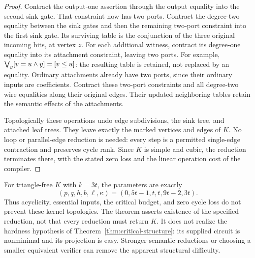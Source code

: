 \begin{proof}
Contract the output-one assertion through the output equality into
the second sink gate. That constraint now has two ports. Contract
the degree-two equality between the sink gates and then the remaining
two-port constraint into the first sink gate. Its surviving table
is the conjunction of the three original incoming bits, at vertex $z$.
For each additional witness, contract its degree-one equality into
its attachment constraint, leaving two ports. For example,
$\bigvee_y[v=u\land y]=[v\le u]$: the resulting table is retained,
not replaced by an equality. Ordinary attachments
already have two ports, since their ordinary inputs are coefficients.
Contract these two-port constraints and all degree-two wire equalities
along their original edges. Their updated neighboring tables retain
the semantic effects of the attachments.

Topologically these operations undo edge subdivisions, the sink tree,
and attached leaf trees. They leave exactly the marked vertices and
edges of $K$. No loop or parallel-edge reduction is needed: every
step is a permitted single-edge contraction and preserves cycle rank.
Since $K$ is simple and cubic, the reduction terminates there, with
the stated zero loss and the linear operation cost of the compiler.
\end{proof}

For triangle-free $K$ with $k=3t$, the parameters are exactly
\[
 (p,q,h,b,\ell,\kappa)=(0,5t-1,t,t,9t-2,3t).
\]
Thus acyclicity, essential inputs, the critical budget, and zero cycle
loss do not prevent these kernel topologies. The theorem asserts
existence of the specified reduction, not that every reduction must
return $K$. It does not realize the hardness hypothesis of
Theorem~\ref{thm:critical-structure}: its supplied circuit is
nonminimal and its projection is easy. Stronger semantic reductions
or choosing a smaller equivalent verifier can remove the apparent
structural difficulty.
